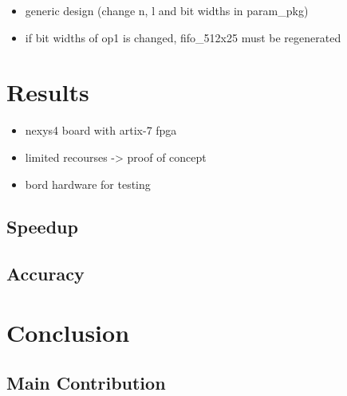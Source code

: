 \documentclass[mscthesis]{usiinfthesis}
\begin{document}
\begin{itemize}
    \item generic design (change n, l and bit widths in param\_pkg)
    \item if bit widths of op1 is changed, fifo\_512x25 must be regenerated
\end{itemize}

\chapter{Results}
\label{ch:results}

\begin{itemize}
    \item nexys4 board with artix-7 fpga
    \item limited recourses -> proof of concept
    \item bord hardware for testing
\end{itemize}

\section{Speedup}

\section{Accuracy}

\chapter{Conclusion}
\label{ch:conc}

\section{Main Contribution}
\label{ch:conc_ach}
\end{document}

